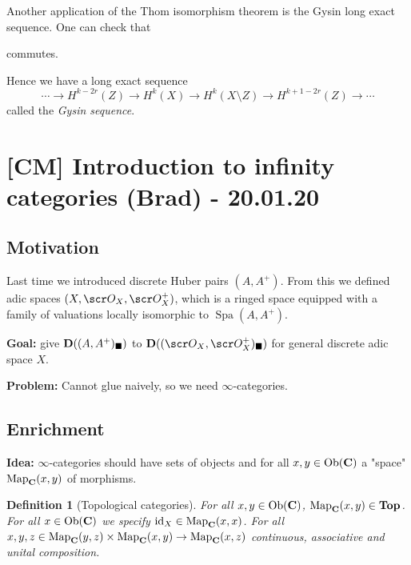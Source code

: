 \documentclass[A4paper, british]{amsart}
\theoremstyle{darkgreentheorem}
\theoremstyle{darkbluedefinition}
\newtheorem{defn}[thm]{Definition}
\theoremstyle{darkredexample}
\theoremstyle{remark}
\DeclareMathOperator{\Ob}{Ob}
\DeclareMathOperator{\Map}{Map}
\newcommand{\1}{\mathbbm{1}}
\newcommand{\id}{\mathrm{id}}
\begin{document}
Another application of the Thom isomorphism theorem is the Gysin long exact sequence.
One can check that
\begin{center}
\end{center}
commutes.

Hence we have a long exact sequence
\[\cdots \to H^{k-2r}(Z)\to H^{k}(X)\to H^{k}(X\setminus Z)\to H^{k+1-2r}(Z)\to \cdots \]
called the \textit{Gysin sequence}.

\section{[CM] Introduction to infinity categories (Brad) - 20.01.20}

\subsection{Motivation}

Last time we introduced discrete Huber pairs $(A,A^{+})$.
From this we defined adic spaces $(X,\O_{X},\O_{X}^{+})$, which is a ringed space equipped with a family of valuations locally isomorphic to $\operatorname{Spa}(A,A^{+})$.

\textbf{Goal:}
give $\mathbf{D}((A,A^{+})_{\blacksquare})$ to $\D((\O_{X},\O_{X}^{+})_{\blacksquare})$ for general discrete adic space $X$.

\textbf{Problem:}
Cannot glue naively, so we need $\infty$-categories.

\subsection{Enrichment}

\textbf{Idea:}
$\infty$-categories should have sets of objects and for all $x,y\in \Ob(\bfC)$ a "space" $\Map_{\bfC}(x,y)$ of morphisms.

\begin{defn}[Topological categories]
    For all $x,y\in \Ob(\bfC)$, $\Map_{\bfC}(x,y)\in \Top$.
    For all $x\in \Ob(\bfC)$ we specify $\id_{X}\in \Map_{\bfC}(x,x)$.
    For all $x,y,z\in \Map_{\bfC}(y,z)\times \Map_{\bfC}(x,y)\to \Map_{\bfC}(x,z)$ continuous, associative and unital composition.
\end{defn}
\end{document}
